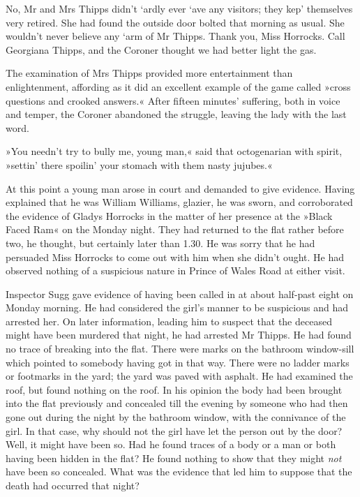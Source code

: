 No, Mr and Mrs Thipps didn't `ardly ever `ave any visitors; they kep' themselves very retired. She had found the outside door bolted that morning as usual. She wouldn't never believe any `arm of Mr Thipps. Thank you, Miss Horrocks. Call Georgiana Thipps, and the Coroner thought we had better light the gas.

The examination of Mrs Thipps provided more entertainment than enlightenment, affording as it did an excellent example of the game called »cross questions and crooked answers.« After fifteen minutes' suffering, both in voice and temper, the Coroner abandoned the struggle, leaving the lady with the last word.

»You needn't try to bully me, young man,« said that octogenarian with spirit, »settin' there spoilin' your stomach with them nasty jujubes.«

At this point a young man arose in court and demanded to give evidence. Having explained that he was William Williams, glazier, he was sworn, and corroborated the evidence of Gladys Horrocks in the matter of her presence at the »Black Faced Ram« on the Monday night. They had returned to the flat rather before two, he thought, but certainly later than 1.30. He was sorry that he had persuaded Miss Horrocks to come out with him when she didn't ought. He had observed nothing of a suspicious nature in Prince of Wales Road at either visit.

Inspector Sugg gave evidence of having been called in at about half-past eight on Monday morning. He had considered the girl's manner to be suspicious and had arrested her. On later information, leading him to suspect that the deceased might have been murdered that night, he had arrested Mr Thipps. He had found no trace of breaking into the flat. There were marks on the bathroom window-sill which pointed to somebody having got in that way. There were no ladder marks or footmarks in the yard; the yard was paved with asphalt. He had examined the roof, but found nothing on the roof. In his opinion the body had been brought into the flat previously and concealed till the evening by someone who had then gone out during the night by the bathroom window, with the connivance of the girl. In that case, why should not the girl have let the person out by the door? Well, it might have been so. Had he found traces of a body or a man or both having been hidden in the flat? He found nothing to show that they might \textit{not} have been so concealed. What was the evidence that led him to suppose that the death had occurred that night?

